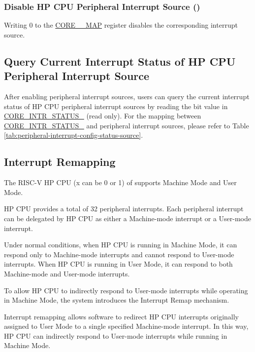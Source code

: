 \documentclass[main\_\_EN.tex]{subfiles}
\begin{document}
\subsubsection{Disable HP CPU Peripheral Interrupt Source ()}

Writing 0 to the \hyperref[fielddesc:CORE0SOURCEMAP]{CORE\_\_MAP} register disables the corresponding interrupt source.

\subsection{Query Current Interrupt Status of HP CPU Peripheral Interrupt Source}

After enabling peripheral interrupt sources, users can query the current interrupt status of HP CPU peripheral interrupt sources by reading the bit value in \hyperref[fielddesc:CORE0INTRSTATUS0]{CORE\_INTR\_STATUS\_} (read only). For the mapping between \hyperref[fielddesc:CORE0INTRSTATUS0]{CORE\_INTR\_STATUS\_} and peripheral interrupt sources, please refer to Table \ref{tab:peripheral-interrupt-config-status-source}.

\subsection{Interrupt Remapping}

The RISC-V HP CPU (x can be 0 or 1) of \chipname{} supports Machine Mode and User Mode.

HP CPU provides a total of 32 peripheral interrupts. Each peripheral interrupt can be delegated by HP CPU as either a Machine-mode interrupt or a User-mode interrupt.

Under normal conditions, when HP CPU is running in Machine Mode, it can respond only to Machine-mode interrupts and cannot respond to User-mode interrupts. When HP CPU is running in User Mode, it can respond to both Machine-mode and User-mode interrupts.

To allow HP CPU to indirectly respond to User-mode interrupts while operating in Machine Mode, the system introduces the Interrupt Remap mechanism.


Interrupt remapping allows software to redirect HP CPU interrupts originally assigned to User Mode to a single specified Machine-mode interrupt. In this way, HP CPU can indirectly respond to User-mode interrupts while running in Machine Mode.
\end{document}
